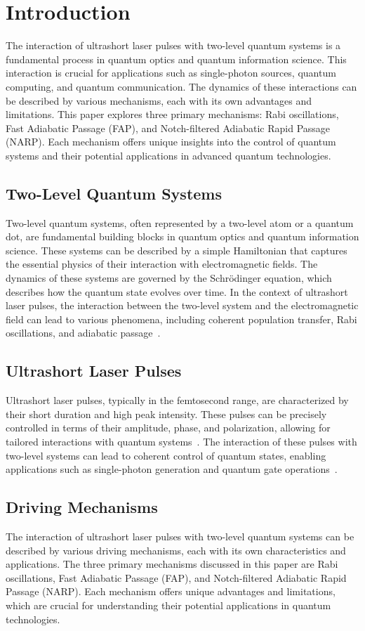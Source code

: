 \documentclass{article}
\begin{document}
\section*{Introduction}
The interaction of ultrashort laser pulses with two-level quantum systems is a fundamental process in quantum optics and quantum information science. This interaction is crucial for applications such as single-photon sources, quantum computing, and quantum communication. The dynamics of these interactions can be described by various mechanisms, each with its own advantages and limitations. This paper explores three primary mechanisms: Rabi oscillations, Fast Adiabatic Passage (FAP), and Notch-filtered Adiabatic Rapid Passage (NARP). Each mechanism offers unique insights into the control of quantum systems and their potential applications in advanced quantum technologies.
\subsection*{Two-Level Quantum Systems}
Two-level quantum systems, often represented by a two-level atom or a quantum dot, are fundamental building blocks in quantum optics and quantum information science. These systems can be described by a simple Hamiltonian that captures the essential physics of their interaction with electromagnetic fields. The dynamics of these systems are governed by the Schrödinger equation, which describes how the quantum state evolves over time. In the context of ultrashort laser pulses, the interaction between the two-level system and the electromagnetic field can lead to various phenomena, including coherent population transfer, Rabi oscillations, and adiabatic passage~\cite{Garside1975OpticalRA}.
\subsection*{Ultrashort Laser Pulses}
Ultrashort laser pulses, typically in the femtosecond range, are characterized by their short duration and high peak intensity. These pulses can be precisely controlled in terms of their amplitude, phase, and polarization, allowing for tailored interactions with quantum systems~\cite{Walmsley2009CharacterizationOU}. The interaction of these pulses with two-level systems can lead to coherent control of quantum states, enabling applications such as single-photon generation and quantum gate operations~\cite{AspuruGuzik2012PhotonicQS}.
\subsection*{Driving Mechanisms}
The interaction of ultrashort laser pulses with two-level quantum systems can be described by various driving mechanisms, each with its own characteristics and applications. The three primary mechanisms discussed in this paper are Rabi oscillations, Fast Adiabatic Passage (FAP), and Notch-filtered Adiabatic Rapid Passage (NARP). Each mechanism offers unique advantages and limitations, which are crucial for understanding their potential applications in quantum technologies.
\end{document}
